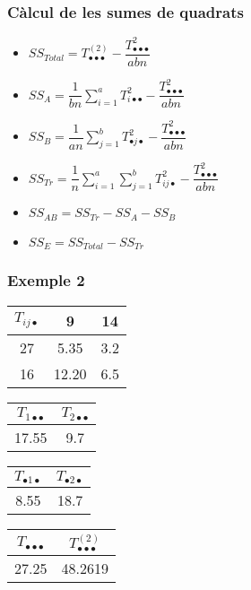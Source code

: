 \documentclass[12pt,t]{beamer}
\theoremstyle{plain}
\theoremstyle{definition}
\begin{document}
\begin{frame}
\frametitle{Càlcul de les sumes de quadrats}
\begin{itemize}

\item $SS_{Total} = T_{\bullet\bullet\bullet}^{(2)}
-\dfrac{T_{\bullet\bullet\bullet}^2}{abn}$
\medskip

\item $SS_A = \displaystyle \dfrac{1}{bn}\sum\limits_{i=1}^a
T_{i\bullet\bullet}^2-\dfrac{T_{\bullet\bullet\bullet}^2}{abn}$
\medskip

\item $SS_B =\displaystyle\dfrac{1}{an}\sum\limits_{j=1}^b T_{\bullet
j\bullet}^2-\dfrac{T_{\bullet\bullet\bullet}^2}{abn}$
\medskip

\item $SS_{Tr}=\displaystyle\dfrac{1}{n}\sum\limits_{i=1}^a\sum\limits_{j=1}^b T_{ij\bullet}^2 -
\dfrac{T_{\bullet\bullet\bullet}^2}{abn}$
\medskip

\item $SS_{AB} = SS_{Tr} -SS_A-SS_B$
\medskip

\item $SS_E = SS_{Total}-SS_{Tr}$
\end{itemize}
\end{frame}





\begin{frame}
\frametitle{Exemple 2}
\begin{center}
\begin{tabular}{c|cc}
$T_{ij\bullet}$ & 9 & 14\\ \hline
27 &  5.35 & 3.2\\
16 &12.20 & 6.5
\end{tabular}
\medskip

\begin{tabular}{cc}
$T_{1\bullet\bullet}$ & $T_{2\bullet\bullet}$ \\ \hline
17.55 &  9.7
\end{tabular}
\quad
\begin{tabular}{cc}
$T_{\bullet 1\bullet}$ & $T_{\bullet 2\bullet}$ \\ \hline
8.55 & 18.7
\end{tabular}
\quad
\begin{tabular}{cc}
$T_{\bullet\bullet\bullet}$ & $T_{\bullet\bullet\bullet}^{(2)}$ \\ \hline
27.25 & 48.2619
\end{tabular}
\bigskip

\end{center}


\end{frame}
\end{document}
